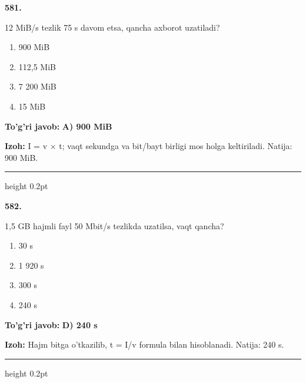 \documentclass[10pt,a4paper,oneside]{article}
\begin{document}
\noindent\textbf{\color{ink}581.}
\par
12 MiB/s tezlik 75 s davom etsa, qancha axborot uzatiladi?
\begin{enumerate}[label=\Alph*),leftmargin=9mm]
\item 900 MiB
\item 112,5 MiB
\item 7 200 MiB
\item 15 MiB
\end{enumerate}
\begin{tcolorbox}[enhanced,breakable,colback=teal!4,colframe=teal!50!black,boxrule=0.5pt,arc=1.1mm,left=3mm,right=3mm,top=1.7mm,bottom=1.7mm,before skip=2mm,after skip=2mm]
\textbf{\color{teal}To'g'ri javob:} \textbf{A) 900 MiB}
\par\smallskip
\textbf{Izoh:} I = v \ensuremath{\times} t; vaqt sekundga va bit/bayt birligi mos holga keltiriladi. Natija: 900 MiB.
\end{tcolorbox}
\vspace{2mm}\hrule height 0.2pt \vspace{3mm}

\noindent\textbf{\color{ink}582.}
\par
1,5 GB hajmli fayl 50 Mbit/s tezlikda uzatilsa, vaqt qancha?
\begin{enumerate}[label=\Alph*),leftmargin=9mm]
\item 30 s
\item 1 920 s
\item 300 s
\item 240 s
\end{enumerate}
\begin{tcolorbox}[enhanced,breakable,colback=teal!4,colframe=teal!50!black,boxrule=0.5pt,arc=1.1mm,left=3mm,right=3mm,top=1.7mm,bottom=1.7mm,before skip=2mm,after skip=2mm]
\textbf{\color{teal}To'g'ri javob:} \textbf{D) 240 s}
\par\smallskip
\textbf{Izoh:} Hajm bitga o'tkazilib, t = I/v formula bilan hisoblanadi. Natija: 240 s.
\end{tcolorbox}
\vspace{2mm}\hrule height 0.2pt \vspace{3mm}
\end{document}
